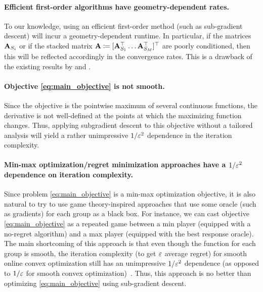     \paragraph{Efficient first-order algorithms have geometry-dependent rates.} To our knowledge, using an efficient first-order method (such as sub-gradient descent) will incur a geometry-dependent runtime. In particular, if the matrices $\mathbf{A}_{S_i}$ or if the stacked matrix $\mathbf{A}\coloneqq [\mathbf{A}_{S_1}^{\top} \dots \mathbf{A}_{S_M}^{\top}]^{\top}$ are poorly conditioned, then this will be reflected accordingly in the convergence rates. This is a drawback of the existing results by \citet{aakmrz22} and \citet{svwz24}.
    \paragraph{Objective \eqref{eq:main_objective} is not smooth.} Since the objective is the pointwise maximum of several continuous functions, the derivative is not well-defined at the points at which the maximizing function changes. Thus, applying subgradient descent to this objective without a tailored analysis will yield a rather unimpressive $1/\varepsilon^{2}$ dependence in the iteration complexity. 
    \paragraph{Min-max optimization/regret minimization approaches have a $1/\varepsilon^{2}$ dependence on iteration complexity.} Since problem \ref{eq:main_objective} is a min-max optimization objective, it is also natural to try to use game theory-inspired approaches that use some oracle (such as gradients) for each group as a black box. For instance, we can cast objective \ref{eq:main_objective} as a repeated game between a min player (equipped with a no-regret algorithm) and a max player (equipped with the best response oracle). The main shortcoming of this approach is that even though the function for each group is smooth, the iteration complexity (to get $\varepsilon$ average regret) for smooth online convex optimization still has an unimpressive $1/\varepsilon^2$ dependence (as opposed to $1/\varepsilon$ for smooth convex optimization)~\citep{soma2022optimal, zhang2024stochastic}. Thus, this approach is no better than optimizing \eqref{eq:main_objective} using sub-gradient descent.
